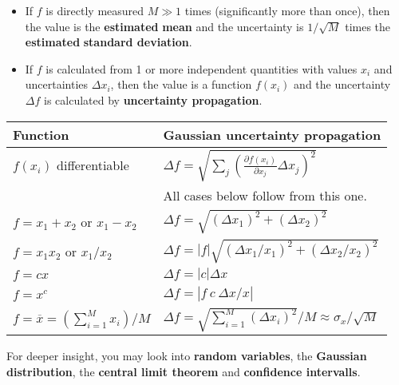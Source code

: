 \documentclass{article}
\begin{document}
\begin{minipage}[t][18cm][c]{11cm}
\begin{itemize}
    \item If $f$ is directly measured $M \gg 1$ times (significantly more than once), then the value is the \textbf{estimated} \textbf{mean} and the uncertainty is $1/\sqrt{M}$ times the \textbf{estimated} \textbf{standard deviation}.
\end{itemize}
\begin{itemize}
    \item If $f$ is calculated from 1 or more independent quantities with values $x_i$ and uncertainties $\Delta x_i$, then the value is a function $f(x_i)$ and the uncertainty $\Delta f$ is calculated by \textbf{uncertainty propagation}.
\end{itemize}


\begin{tabular}{|m{}|m{}|}
    \hline
    \textbf{Function} & \textbf{Gaussian uncertainty propagation}\\
    \hline
    $f(x_i)$ differentiable &  $\Delta f = \sqrt{\sum_{j} \left( \frac{\partial f(x_i)}{\partial x_j} \Delta x_j \right)^2}$ \\
    & All cases below follow from this one.\\
    \hline
    $f = x_1 + x_2$ or $x_1 - x_2$ & $\Delta f = \sqrt{(\Delta x_1)^2 + (\Delta x_2)^2}$\\
    \hline
    $f = x_1x_2$ or $x_1 / x_2$ & $\Delta f = \left|f\right| \sqrt{(\Delta x_1 / x_1)^2 + (\Delta x_2/x_2)^2}$\\
    \hline    
    $f = cx$ & $\Delta f = \left|c\right| \Delta x$ \\
    \hline
    $f = x^c$ & $\Delta f = \left|f \: c \: \Delta x / x \right|$\\
    \hline
    $f = \overline{x} = (\sum_{i=1}^M x_i)/M $ & $\Delta f = \sqrt{\sum_{i=1}^M (\Delta x_i)^2} / M \approx \sigma_x / \sqrt{M}$ \\
    \hline
\end{tabular}

\bigskip

For deeper insight, you may look into \textbf{random variables}, the \textbf{Gaussian distribution}, the \textbf{central limit theorem} and \textbf{confidence intervalls}. 


\end{minipage}
\begin{minipage}[t][18cm][c]{0.5cm}
    \hfill
\end{minipage}
\end{document}
